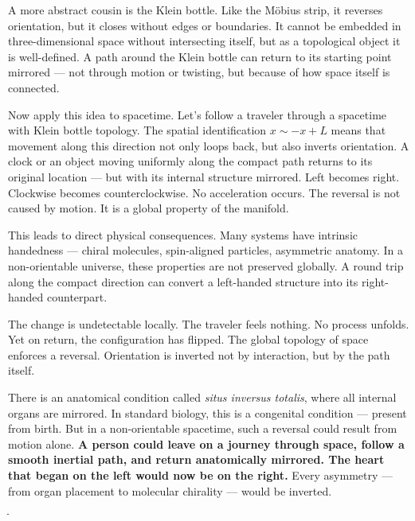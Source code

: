 A more abstract cousin is the Klein bottle. Like the Möbius strip, it reverses orientation, but it closes without edges or boundaries. It cannot be embedded in three-dimensional space without intersecting itself, but as a topological object it is well-defined. A path around the Klein bottle can return to its starting point mirrored — not through motion or twisting, but because of how space itself is connected.

Now apply this idea to spacetime. Let's follow a traveler through a spacetime with Klein bottle topology. The spatial identification $x \sim -x + L$ means that movement along this direction not only loops back, but also inverts orientation. A clock or an object moving uniformly along the compact path returns to its original location — but with its internal structure mirrored. Left becomes right. Clockwise becomes counterclockwise. No acceleration occurs. The reversal is not caused by motion. It is a global property of the manifold.

This leads to direct physical consequences. Many systems have intrinsic handedness — chiral molecules, spin-aligned particles, asymmetric anatomy. In a non-orientable universe, these properties are not preserved globally. A round trip along the compact direction can convert a left-handed structure into its right-handed counterpart.

The change is undetectable locally. The traveler feels nothing. No process unfolds. Yet on return, the configuration has flipped. The global topology of space enforces a reversal. Orientation is inverted not by interaction, but by the path itself.

There is an anatomical condition called \textit{situs inversus totalis}, where all internal organs are mirrored. In standard biology, this is a congenital condition — present from birth. But in a non-orientable spacetime, such a reversal could result from motion alone. \textbf{A person could leave on a journey through space, follow a smooth inertial path, and return anatomically mirrored. The heart that began on the left would now be on the right.} Every asymmetry — from organ placement to molecular chirality — would be inverted.

ֿ\clearpage

